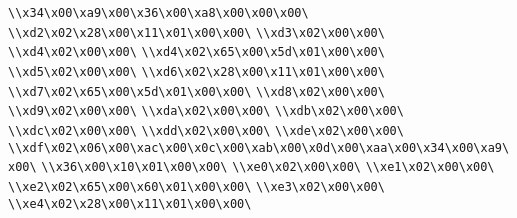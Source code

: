 \verb|\\x34\x00\xa9\x00\x36\x00\xa8\x00\x00\x00\|\newline
\verb|\\xd2\x02\x28\x00\x11\x01\x00\x00\|\newline
\verb|\\xd3\x02\x00\x00\|\newline
\verb|\\xd4\x02\x00\x00\|\newline
\verb|\\xd4\x02\x65\x00\x5d\x01\x00\x00\|\newline
\verb|\\xd5\x02\x00\x00\|\newline
\verb|\\xd6\x02\x28\x00\x11\x01\x00\x00\|\newline
\verb|\\xd7\x02\x65\x00\x5d\x01\x00\x00\|\newline
\verb|\\xd8\x02\x00\x00\|\newline
\verb|\\xd9\x02\x00\x00\|\newline
\verb|\\xda\x02\x00\x00\|\newline
\verb|\\xdb\x02\x00\x00\|\newline
\verb|\\xdc\x02\x00\x00\|\newline
\verb|\\xdd\x02\x00\x00\|\newline
\verb|\\xde\x02\x00\x00\|\newline
\verb|\\xdf\x02\x06\x00\xac\x00\x0c\x00\xab\x00\x0d\x00\xaa\x00\x34\x00\xa9\x00\|\newline
\verb|\\x36\x00\x10\x01\x00\x00\|\newline
\verb|\\xe0\x02\x00\x00\|\newline
\verb|\\xe1\x02\x00\x00\|\newline
\verb|\\xe2\x02\x65\x00\x60\x01\x00\x00\|\newline
\verb|\\xe3\x02\x00\x00\|\newline
\verb|\\xe4\x02\x28\x00\x11\x01\x00\x00\|\newline
